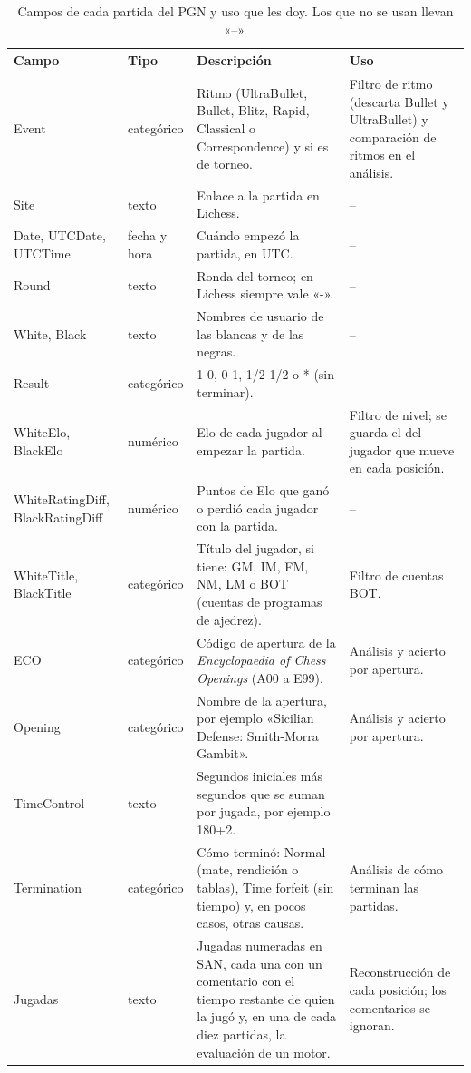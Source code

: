 \documentclass[a4paper,12pt,twocolumn]{article}
\renewcommand{\arraystretch}{1.1}
\begin{document}
\begin{table}[!t]
	\centering
	\footnotesize
	\setlength{\tabcolsep}{4pt}
	\renewcommand{\arraystretch}{1.15}
	\begin{tabular}{L{2.9cm}L{1.8cm}L{6.0cm}L{3.7cm}}
		\hline
		Campo & Tipo & Descripción & Uso \\
		\hline
		Event & categórico & Ritmo (UltraBullet, Bullet, Blitz, Rapid, Classical o Correspondence) y si es de torneo. & Filtro de ritmo (descarta Bullet y UltraBullet) y comparación de ritmos en el análisis. \\
		Site & texto & Enlace a la partida en Lichess. & -- \\
		Date, UTCDate, UTCTime & fecha y hora & Cuándo empezó la partida, en UTC. & -- \\
		Round & texto & Ronda del torneo; en Lichess siempre vale «-». & -- \\
		White, Black & texto & Nombres de usuario de las blancas y de las negras. & -- \\
		Result & categórico & 1-0, 0-1, 1/2-1/2 o * (sin terminar). & -- \\
		WhiteElo, BlackElo & numérico & Elo de cada jugador al empezar la partida. & Filtro de nivel; se guarda el del jugador que mueve en cada posición. \\
		WhiteRatingDiff, BlackRatingDiff & numérico & Puntos de Elo que ganó o perdió cada jugador con la partida. & -- \\
		WhiteTitle, BlackTitle & categórico & Título del jugador, si tiene: GM, IM, FM, NM, LM o BOT (cuentas de programas de ajedrez). & Filtro de cuentas BOT. \\
		ECO & categórico & Código de apertura de la \textit{Encyclopaedia of Chess Openings} (A00 a E99). & Análisis y acierto por apertura. \\
		Opening & categórico & Nombre de la apertura, por ejemplo «Sicilian Defense: Smith-Morra Gambit». & Análisis y acierto por apertura. \\
		TimeControl & texto & Segundos iniciales más segundos que se suman por jugada, por ejemplo 180+2. & -- \\
		Termination & categórico & Cómo terminó: Normal (mate, rendición o tablas), Time forfeit (sin tiempo) y, en pocos casos, otras causas. & Análisis de cómo terminan las partidas. \\
		Jugadas & texto & Jugadas numeradas en SAN, cada una con un comentario con el tiempo restante de quien la jugó y, en una de cada diez partidas, la evaluación de un motor. & Reconstrucción de cada posición; los comentarios se ignoran. \\
		\hline
	\end{tabular}
	\caption{Campos de cada partida del PGN y uso que les doy. Los que no se usan llevan «--».}
	\label{tab:campos}
\end{table}
\end{document}
